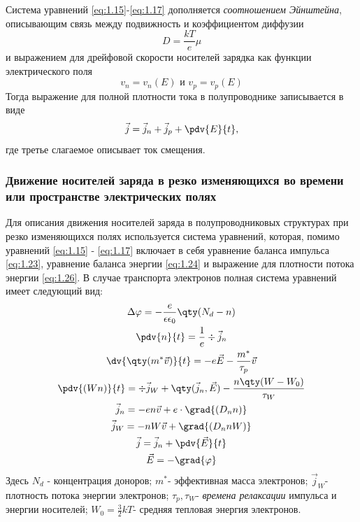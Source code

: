  	Система уравнений \eqref{eq:1.15}-\eqref{eq:1.17} дополняется \textit{соотношением Эйнштейна}, описывающим связь между подвижность и коэффициентом диффузии
 	\begin{equation}
 		D=\frac{kT}{e}\mu
 	\end{equation}
 	и выражением для дрейфовой скорости носителей зарядка как функции электрического поля
 	\begin{equation}
 		v_n=v_n(E) \text{ и } v_p=v_p(E)
 	\end{equation}
 	Тогда выражение для полной плотности тока в полупроводнике записывается в виде
 	\begin{equation}
 		\vec j = \vec j_n +\vec j_p +\pdv{E}{t},
 	\end{equation}
 	где третье слагаемое описывает ток смещения.


 	\subsubsection{Движение носителей заряда в резко изменяющихся во времени или пространстве электрических полях}


Для описания движения носителей заряда в полупроводниковых структурах при резко изменяющихся полях используется система уравнений, которая,
помимо уравнений \eqref{eq:1.15} - \eqref{eq:1.17} включает в себя уравнение баланса импульса
\eqref{eq:1.23}, уравнение баланса энергии \eqref{eq:1.24} и выражение для плотности потока
энергии \eqref{eq:1.26}. В случае транспорта электронов полная система уравнений имеет
следующий вид:
\begin{gather}
	\label{eq:1.21}
	\Delta  \varphi = -\frac{e}{\epsilon \epsilon_0} \qty(N_d-n)  \\
	\label{eq:1.22}
	\pdv{n}{t}=\frac{1}{e} \div{\vec j_n}\\
	\label{eq:1.23}
	\dv{ \qty (m^*\vec v) }{t}= -e\vec E - \frac{m^*}{\tau_p} \vec v \\
	\label{eq:1.24}
	\pdv{(Wn)}{t}=\div{\vec j_W}+ \qty(\vec j_n, \vec E)-\frac{n\qty(W-W_0)}{\tau_W} \\
	\label{eq:1.25}
	\vec j_n = - en\vec v + e\cdot \grad{(D_n n)} \\
	\label{eq:1.26}
	\vec j_W= -nW \vec v +\grad{(D_n n W)} \\ 
	\label{eq:1.27}
	\vec j = \vec j_n + \pdv{\vec E}{t} \\
	\label{eq:1.28} 
	\vec{E}=-\grad{\varphi}
\end{gather}
Здесь $N_d$ - концентрация доноров; 
$m^*$- эффективная масса электронов;
$\vec j_W$- плотность потока энергии электронов;
$\tau_p, \tau_W$- \textit{времена релаксации} импульса и энергии носителей;
$W_0=\frac32 kT$- средняя тепловая энергия электронов.

